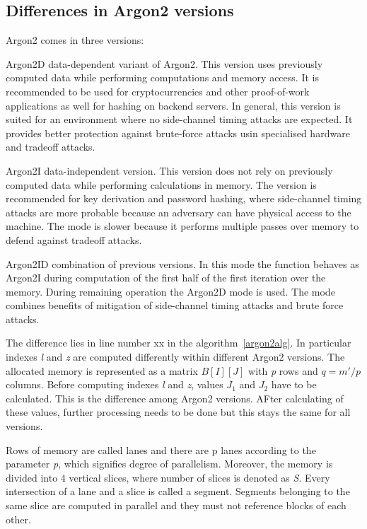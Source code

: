 \documentclass[nolof]{fithesis3}
\begin{document}
\subsection{Differences in Argon2 versions}
\label{argon2versions}
Argon2 comes in three versions:

\begin{description}
\item{Argon2D} data-dependent variant of Argon2. This version uses previously computed data while performing computations and memory access. It is recommended to be used for cryptocurrencies and other proof-of-work applications as well for hashing on backend servers. In general, this version is suited for an environment where no side-channel timing attacks are expected. It provides better protection against brute-force attacks usin specialised hardware and tradeoff attacks.

\item{Argon2I} data-independent version. This version does not rely on previously computed data while performing calculations in memory. The version is recommended for key derivation and password hashing, where side-channel timing attacks are more probable because an adversary can have physical access to the machine. The mode is slower because it performs multiple passes over memory to defend against tradeoff attacks.

\item{Argon2ID} combination of previous versions. In this mode the function behaves as Argon2I during computation of the first half of the first iteration over the memory. During remaining operation the Argon2D mode is used. The mode combines benefits of mitigation of side-channel timing attacks and brute force attacks.
\end{description}

The difference lies in line number xx in the algorithm~\ref{argon2alg}. In particular indexes \emph{l} and \emph{z} are computed differently within different Argon2 versions. The allocated memory is represented as a matrix \(B[I][J]\) with \emph{p} rows and \(q = m' / p\) columns. Before computing indexes \emph{l} and \emph{z}, values \(J_1\) and \(J_2\) have to be calculated. This is the difference among Argon2 versions. AFter calculating of these values, further processing needs to be done but this stays the same for all versions.

Rows of memory are called lanes and there are p lanes according to the parameter \emph{p}, which signifies degree of parallelism. Moreover, the memory is divided into 4 vertical slices, where number of slices is denoted as \emph{S}. Every intersection of a lane and a slice is called a segment. Segments belonging to the same slice are computed in parallel and they must not reference blocks of each other.
\end{document}
